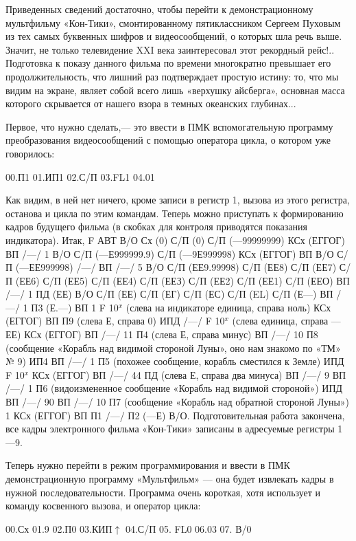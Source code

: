 \documentclass[11pt,a4paper,oneside]{article}
\begin{document}
Приведенных сведений достаточно, чтобы перейти к демонстрационному мультфильму «Кон-Тики», смонтированному пятиклассником Сергеем Пуховым из тех самых буквенных шифров и видеосообщений, о которых шла речь выше. Значит, не только телевидение XXI века заинтересовал этот рекордный рейс!.. Подготовка к показу данного фильма по времени многократно превышает его продолжительность, что лишний раз подтверждает простую истину: то, что мы видим на экране, являет собой всего лишь «верхушку айсберга», основная масса которого скрывается от нашего взора в темных океанских глубинах...

Первое, что нужно сделать,— это ввести в ПМК вспомогательную программу преобразования видеосообщений с помощью оператора цикла, о котором уже говорилось:

00.П1 01.ИП1 02.С/П 03.FL1 04.01

Как видим, в ней нет ничего, кроме записи в регистр 1, вызова из этого регистра, останова и цикла по этим командам. Теперь можно приступать к формированию кадров будущего фильма (в скобках для контроля приводятся показания индикатора). Итак, F АВТ В/О Сх (0) С/П (0) С/П (—99999999) КСх (ЕГГОГ) ВП /—/ 1 В/О С/П (—Е999999.9) С/П (—9Е999998) КСх (ЕГГОГ) ВП В/О С/П (—ЕЕ999998) /—/ ВП /—/ 5 В/О С/П (ЕЕ9.99998) С/П (ЕЕ8) С/П (ЕЕ7) С/П (ЕЕ6) С/П (ЕЕ5) С/П (ЕЕ4) С/П (ЕЕЗ) С/П (ЕЕ2) С/П (ЕЕ1) С/П (ЕЕО) ВП /—/ 1 ПД (ЕЕ) В/О С/П (ЕЕ) С/П (ЕГ) С/П (ЕС) С/П (EL) С/П (Е—) ВП /—/ 1 П3 (Е.—) ВП 1 F 10$^{x}$ (слева на индикаторе единица, справа ноль) КСх (ЕГГОГ) ВП П9 (слева Е, справа 0) ИПД /—/ F 10$^{x}$ (слева единица, справа — ЕЕ) КСх (ЕГГОГ) ВП /—/ 11 П4 (слева Е, справа минус) ВП /—/ 10 П8 (сообщение «Корабль над видимой стороной Луны», оно нам знакомо по «ТМ» № 9) ИП4 ВП /—/ 1 П5 (похожее сообщение, корабль сместился к Земле) ИПД F 10$^{x}$ КСх (ЕГГОГ) ВП /—/ 44 ПД (слева Е, справа два минуса) ВП /—/ 9 ВП /—/ 1 П6 (видоизмененное сообщение «Корабль над видимой стороной») ИПД ВП /—/ 90 ВП /—/ 10 П7 (сообщение «Корабль над обратной стороной Луны») 1 КСх (ЕГГОГ) ВП П1 /—/ П2 (—Е) В/О. Подготовительная работа закончена, все кадры электронного фильма «Кон-Тики» записаны в адресуемые регистры 1—9.

Теперь нужно перейти в режим программирования и ввести в ПМК демонстрационную программу «Мультфильм» — она будет извлекать кадры в нужной последовательности. Программа очень короткая, хотя использует и команду косвенного вызова, и оператор цикла:

00.Сх 01.9 02.П0 03.КИП$\uparrow$ 04.С/П 05. FL0 06.03 07. В/0
\end{document}
